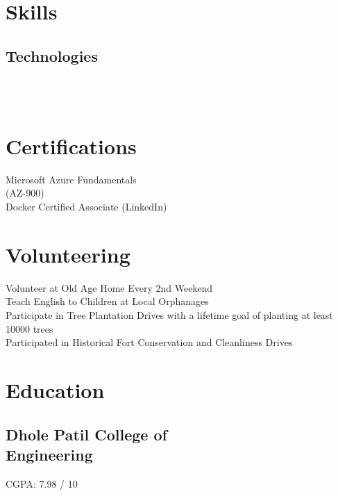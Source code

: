\documentclass[]{1-mahesh}
\begin{document}
\begin{minipage}[t]{0.33\textwidth} 

\section{Skills}
\subsection{Technologies}
\vspace{\topsep} 
   \\
 
  \\     

\vspace{\topsep} 
\vspace{\topsep} 
   
\sectionsep

\section{Certifications}
\textbullet{} Microsoft Azure Fundamentals \\ (AZ-900) \\
\textbullet{} Docker Certified Associate (LinkedIn) \\
\sectionsep

\section{Volunteering}
\textbullet{} Volunteer at Old Age Home Every 2nd Weekend \\
\textbullet{} Teach English to Children at Local Orphanages \\
\textbullet{} Participate in Tree Plantation Drives with a lifetime goal of planting at least 10000 trees \\
\textbullet{} Participated in Historical Fort Conservation and Cleanliness Drives \\
\sectionsep

\section{Education} 
\subsection{Dhole Patil College of \\ 
Engineering}
CGPA: 7.98 / 10
\sectionsep

\end{minipage} 
\end{document}
